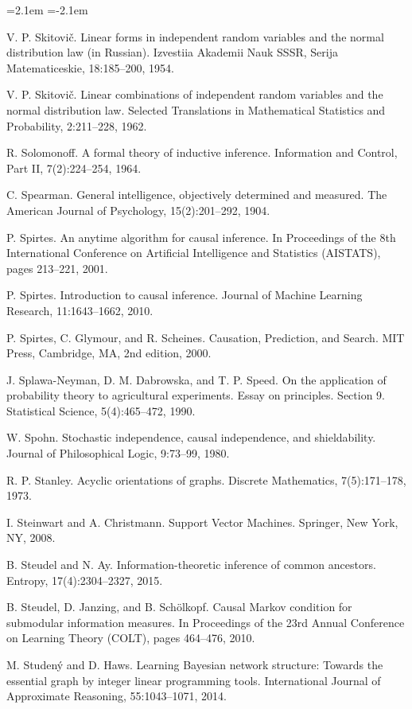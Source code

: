 \begin{list}{}{\leftmargin=2.1em
 \itemindent=-2.1em\parsep=0pt\itemsep=3pt}
\item V. P. Skitovič. Linear forms in independent random variables and the normal distribution law (in Russian). Izvestiia Akademii Nauk SSSR, Serija Matematiceskie, 18:185--200, 1954.
\item V. P. Skitovič. Linear combinations of independent random variables and the normal distribution law. Selected Translations in Mathematical Statistics and Probability, 2:211--228, 1962.
\item R. Solomonoff. A formal theory of inductive inference. Information and Control, Part II, 7(2):224--254, 1964.
\item C. Spearman. General intelligence, objectively determined and measured. The American Journal of Psychology, 15(2):201--292, 1904.
\item P. Spirtes. An anytime algorithm for causal inference. In Proceedings of the 8th International Conference on Artificial Intelligence and Statistics (AISTATS), pages 213--221, 2001.
\item P. Spirtes. Introduction to causal inference. Journal of Machine Learning Research, 11:1643--1662, 2010.
\item P. Spirtes, C. Glymour, and R. Scheines. Causation, Prediction, and Search. MIT Press, Cambridge, MA, 2nd edition, 2000.
\item J. Splawa-Neyman, D. M. Dabrowska, and T. P. Speed. On the application of probability theory to agricultural experiments. Essay on principles. Section 9. Statistical Science, 5(4):465--472, 1990.
\item W. Spohn. Stochastic independence, causal independence, and shieldability. Journal of Philosophical Logic, 9:73--99, 1980.
\item R. P. Stanley. Acyclic orientations of graphs. Discrete Mathematics, 7(5):171--178, 1973.
\item I. Steinwart and A. Christmann. Support Vector Machines. Springer, New York, NY, 2008.
\item B. Steudel and N. Ay. Information-theoretic inference of common ancestors. Entropy, 17(4):2304--2327, 2015.
\item B. Steudel, D. Janzing, and B. Schölkopf. Causal Markov condition for submodular information measures. In Proceedings of the 23rd Annual Conference on Learning Theory (COLT), pages 464--476, 2010.
\item M. Studený and D. Haws. Learning Bayesian network structure: Towards the essential graph by integer linear programming tools. International Journal of Approximate Reasoning, 55:1043--1071, 2014.

\end{list}
